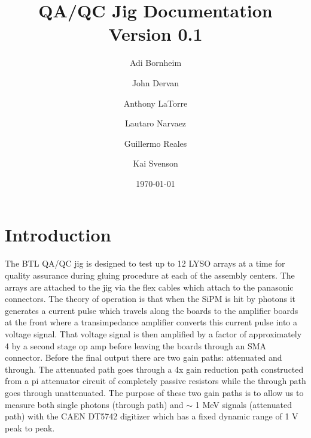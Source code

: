 \documentclass[12pt,openright,twoside]{report}
\title{QA/QC Jig Documentation \\ \large Version 0.1}
\author{Adi Bornheim \and John Dervan \and Anthony LaTorre \and Lautaro Narvaez \and Guillermo Reales \and Kai Svenson}
\date{\today}
\begin{document}
\begin{titlepage}
    \pagecolor{bg}\afterpage{\nopagecolor}
    
\end{titlepage}
\begin{titlepage}
    \maketitle
\end{titlepage}
\tableofcontents
\chapter{Introduction}
The BTL QA/QC jig is designed to test up to 12 LYSO arrays at a time for
quality assurance during gluing procedure at each of the assembly centers. The
arrays are attached to the jig via the flex cables which attach to the
panasonic connectors. The theory of operation is that when the SiPM is hit by
photons it generates a current pulse which travels along the boards to the
amplifier boards at the front where a transimpedance amplifier converts this
current pulse into a voltage signal. That voltage signal is then amplified by a
factor of approximately 4 by a second stage op amp before leaving the boards
through an SMA connector. Before the final output there are two gain paths:
attenuated and through. The attenuated path goes through a 4x gain reduction
path constructed from a pi attenuator circuit of completely passive resistors
while the through path goes through unattenuated. The purpose of these two gain
paths is to allow us to measure both single photons (through path) and $\sim$ 1
MeV signals (attenuated path) with the CAEN DT5742 digitizer which has a fixed
dynamic range of 1 V peak to peak.
\end{document}

